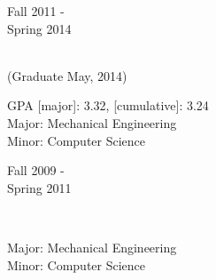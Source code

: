 
\flushleft \begin{minipage}[t]{\dateColWidth}
\flushleft
Fall 2011 - \\[0.2 em]
Spring 2014
\end{minipage}
\begin{minipage}[t]{0.425\textwidth}
 \\(Graduate May, 2014) \\[-1.2 em]

\begin{adjustwidth}{2.5 em}{0 em}
GPA [major]: 3.32, [cumulative]: 3.24 \\
Major: Mechanical Engineering \\
Minor: Computer Science

\end{adjustwidth}
\end{minipage}
\begin{minipage}[t]{0.4\textwidth}
\center \begin{adjustwidth}{1 em}{0 em}
\end{adjustwidth}
\end{minipage}
\divLine

\flushleft \begin{minipage}[t]{\dateColWidth}
Fall 2009 - \\[0.2 em] 
Spring 2011
\end{minipage}
\begin{minipage}[t]{0.425\textwidth}
\begin{flushleft}
 \\[-1 em]
\begin{adjustwidth}{2.5 em}{0 em}

Major: Mechanical Engineering \\
Minor: Computer Science

\end{adjustwidth}
\end{flushleft}
\end{minipage}
%
\begin{minipage}[t]{0.4\textwidth}
\center \begin{adjustwidth}{1 em}{0 em}
\end{adjustwidth}
\end{minipage}
